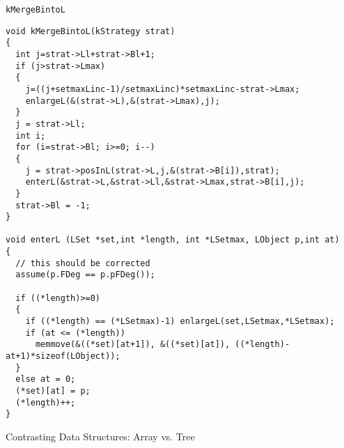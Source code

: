 \documentclass[11pt]{beamer}
\begin{document}
\begin{frame}[fragile]{\tt kMergeBintoL}
\tiny\begin{verbatim}
void kMergeBintoL(kStrategy strat)
{
  int j=strat->Ll+strat->Bl+1;
  if (j>strat->Lmax)
  {
    j=((j+setmaxLinc-1)/setmaxLinc)*setmaxLinc-strat->Lmax;
    enlargeL(&(strat->L),&(strat->Lmax),j);
  }
  j = strat->Ll;
  int i;
  for (i=strat->Bl; i>=0; i--)
  {
    j = strat->posInL(strat->L,j,&(strat->B[i]),strat);
    enterL(&strat->L,&strat->Ll,&strat->Lmax,strat->B[i],j);
  }
  strat->Bl = -1;
}

void enterL (LSet *set,int *length, int *LSetmax, LObject p,int at)
{
  // this should be corrected
  assume(p.FDeg == p.pFDeg());

  if ((*length)>=0)
  {
    if ((*length) == (*LSetmax)-1) enlargeL(set,LSetmax,*LSetmax);
    if (at <= (*length))
      memmove(&((*set)[at+1]), &((*set)[at]), ((*length)-at+1)*sizeof(LObject));
  }
  else at = 0;
  (*set)[at] = p;
  (*length)++;
}
\end{verbatim}
\end{frame}

\begin{frame}{Contrasting Data Structures: Array vs. Tree}
\centering
{}
\end{frame}
\end{document}
